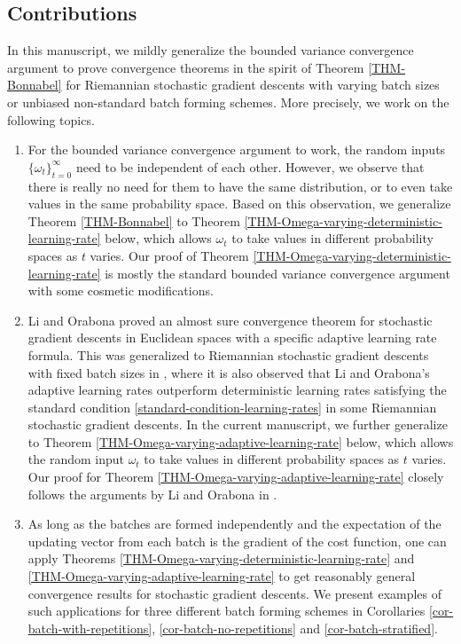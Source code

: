 \documentclass{amsart}
\theoremstyle{plain}
\theoremstyle{definition}
\theoremstyle{remark}
\numberwithin{theorem}{section}
\numberwithin{equation}{section}
\begin{document}
\subsection{Contributions}

In this manuscript, we mildly generalize the bounded variance convergence argument to prove convergence theorems in the spirit of Theorem \ref{THM-Bonnabel} for Riemannian stochastic gradient descents with varying batch sizes or unbiased non-standard batch forming schemes. More precisely, we work on the following topics.
\begin{enumerate}
	\item For the bounded variance convergence argument to work, the random inputs $\{\omega_t\}_{t=0}^\infty$ need to be independent of each other. However, we observe that there is really no need for them to have the same distribution, or to even take values in the same probability space. Based on this observation, we generalize Theorem \ref{THM-Bonnabel} to Theorem \ref{THM-Omega-varying-deterministic-learning-rate} below, which allows $\omega_t$ to take values in different probability spaces as $t$ varies. Our proof of Theorem \ref{THM-Omega-varying-deterministic-learning-rate} is mostly the standard bounded variance convergence argument with some cosmetic modifications.
	\item Li and Orabona proved an almost sure convergence theorem \cite[Theorem 2]{Li-Orabona} for stochastic gradient descents in Euclidean spaces with a specific adaptive learning rate formula. This was generalized to Riemannian stochastic gradient descents with fixed batch sizes in \cite{XW-2026,YXW-2024}, where it is also observed that Li and Orabona's adaptive learning rates outperform deterministic learning rates satisfying the standard condition \eqref{standard-condition-learning-rates} in some Riemannian stochastic gradient descents. In the current manuscript, we further generalize \cite[Theorem 2]{Li-Orabona} to Theorem \ref{THM-Omega-varying-adaptive-learning-rate} below, which allows the random input $\omega_t$ to take values in different probability spaces as $t$ varies. Our proof for Theorem \ref{THM-Omega-varying-adaptive-learning-rate} closely follows the arguments by Li and Orabona in \cite{Li-Orabona}. 
	\item As long as the batches are formed independently and the expectation of the updating vector from each batch is the gradient of the cost function, one can apply Theorems \ref{THM-Omega-varying-deterministic-learning-rate} and \ref{THM-Omega-varying-adaptive-learning-rate} to get reasonably general convergence results for stochastic gradient descents. We present examples of such applications for three different batch forming schemes in Corollaries \ref{cor-batch-with-repetitions}, \ref{cor-batch-no-repetitions} and \ref{cor-batch-stratified}.

\end{enumerate}
\end{document}
